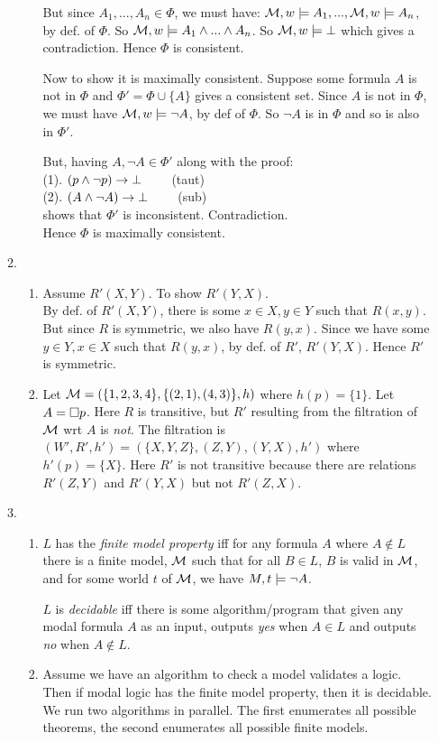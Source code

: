 \documentclass[a4paper, draft, 12pt]{article}
\begin{document}
\begin{enumerate}
\begin{enumerate}
\begin{enumerate}
  But since $A_1, ..., A_n \in \Phi$, we must have:
  $\mathcal{M}, w \models A_1, ..., \mathcal{M}, w \models A_n$, by def. of $\Phi$. 
  So $\mathcal{M}, w \models A_1 \wedge ... \wedge A_n$. So $\mathcal{M}, w \models \bot$ which gives a contradiction.
  Hence $\Phi$ is consistent. 

  Now to show it is maximally consistent. Suppose some formula $A$ is not in $\Phi$ 
  and $\Phi' = \Phi \cup\{A\}$ gives a consistent set. Since $A$ is not in $\Phi$, 
  we must have $\mathcal{M}, w \models \neg A$, by def of $\Phi$. So $\neg A$ is in $\Phi$ 
  and so is also in $\Phi'$.

  But, having $A, \neg A \in \Phi'$ along with the proof: \\
  (1). $(p \wedge \neg p) \rightarrow \bot \qquad$ (taut) \\
  (2). $(A \wedge \neg A) \rightarrow \bot \qquad$ (sub) \\
  shows that $\Phi'$ is inconsistent. Contradiction. \\
  Hence $\Phi$ is maximally consistent.
  \end{enumerate}
\item %
  \begin{enumerate}
  \item %
  Assume $R'(X,Y)$. To show $R'(Y,X)$. \\
  By def. of $R'(X,Y)$, there is some $x \in X, y \in Y$ 
  such that $R(x,y)$. But since $R$ is symmetric, 
  we also have $R(y,x)$. 
  Since we have some $y \in Y, x \in X$ such that $R(y,x)$, by def. of $R'$, 
  $R'(Y,X)$. Hence $R'$ is symmetric.
  \item %
  Let $\mathcal{M} = (\{1,2,3,4\}, \{(2,1), (4,3)\}, h)$ where $h(p) = \{1\}$. Let $A = \square p$. 
  Here $R$ is transitive, but $R'$ resulting from the filtration of $\mathcal{M}$ wrt $A$ is \textit{not}. 
  The filtration is $(W',R', h') = (\{X,Y,Z\}, (Z,Y), (Y,X), h')$ where $h'(p) = \{X\}$. Here 
  $R'$ is not transitive because there are relations $R'(Z,Y)$ and $R'(Y,X)$ but not $R'(Z,X)$. 
  \end{enumerate}
  \item %
  \begin{enumerate}
  \item %
  $L$ has the \textit{finite model property} iff 
  for any formula $A$ where $A \notin L$
  there is a finite model, $\mathcal{M}$ 
  such that for all $B \in L$, $B$ is valid in $\mathcal{M}$, 
  and for some world $t$ of $\mathcal{M}$, we have $M,t \models \neg A$.

  $L$ is \textit{decidable} iff 
  there is some algorithm/program that given any modal formula $A$ as an input, 
  outputs \textit{yes} when $A \in L$ and outputs \textit{no} when $A \notin L$. 
  \item %
  Assume we have an algorithm to check a model validates a logic. \\
  Then if modal logic has the finite model property, then it is decidable. 
  We run two algorithms in parallel. The first enumerates all possible 
  theorems, the second enumerates all possible finite models. 
  

\end{enumerate}
\end{enumerate}
\end{enumerate}
\end{document}
